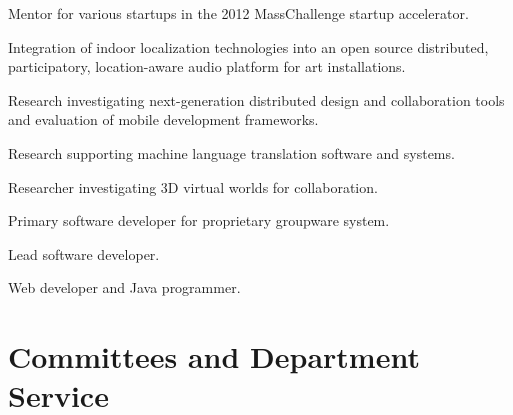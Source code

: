 \documentclass[line]{res}
\begin{document}
\begin{resume}
	\begin{position}
		Mentor for various startups in the 2012 MassChallenge startup accelerator.
	\end{position}
	
	\begin{position}
		Integration of indoor localization technologies into an open source distributed, participatory, location-aware audio platform for art installations.
	\end{position}
	
	\begin{position}
		Research investigating next-generation distributed design and collaboration tools and evaluation of mobile development frameworks.
	\end{position}
	
	\begin{position}
		Research supporting machine language translation software and systems. 
	\end{position}
	
	\begin{position}
		Researcher investigating 3D virtual worlds for collaboration. 
	\end{position}
	
	\begin{position}
		Primary software developer for proprietary groupware system. 
	\end{position}
	
	\begin{position}
		Lead software developer. 
	\end{position}
	
	\begin{position}
		Web developer and Java programmer. 
	\end{position}
	
	\section{\sc Committees and Department Service}
	

\end{resume}
\end{document}
